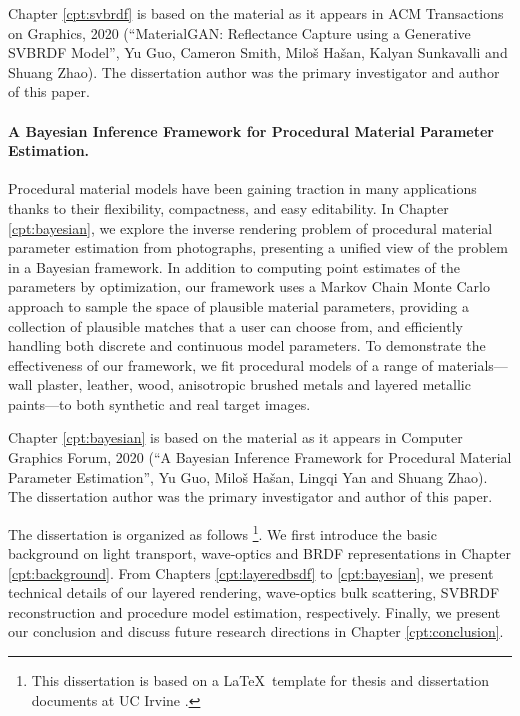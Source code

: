 Chapter \ref{cpt:svbrdf} is based on the material as it appears in ACM Transactions on Graphics, 2020
(“MaterialGAN: Reflectance Capture using a Generative SVBRDF Model”, Yu Guo, Cameron Smith, Milo\v{s} Ha\v{s}an, Kalyan Sunkavalli and Shuang Zhao). The dissertation author was the primary investigator and author of this paper.

\paragraph{A Bayesian Inference Framework for Procedural Material Parameter Estimation.}
Procedural material models have been gaining traction in many applications thanks to their flexibility, compactness, and easy editability.
In Chapter \ref{cpt:bayesian}, we explore the inverse rendering problem of procedural material parameter estimation from photographs, presenting a unified view of the problem in a Bayesian framework. In addition to computing point estimates of the parameters by optimization, our framework uses a Markov Chain Monte Carlo approach to sample the space of plausible material parameters, providing a collection of plausible matches that a user can choose from, and efficiently handling both discrete and continuous model parameters. To demonstrate the effectiveness of our framework, we fit procedural models of a range of materials---wall plaster, leather, wood, anisotropic brushed metals and layered metallic paints---to both synthetic and real target images.

Chapter \ref{cpt:bayesian} is based on the material as it appears in Computer Graphics Forum, 2020
(“A Bayesian Inference Framework for Procedural Material Parameter Estimation”, Yu Guo, Milo\v{s} Ha\v{s}an, Lingqi Yan and Shuang Zhao). The dissertation author was the primary investigator and author of this paper.

The dissertation is organized as follows \footnote{This dissertation is based on a \LaTeX~template for thesis and dissertation documents at UC Irvine \cite{uci-thesis-latex}.}. We first introduce the basic background on light transport, wave-optics and BRDF representations in Chapter \ref{cpt:background}. From Chapters \ref{cpt:layeredbsdf} to \ref{cpt:bayesian}, we present technical details of our layered rendering, wave-optics bulk scattering, SVBRDF reconstruction and procedure model estimation, respectively. Finally, we present our conclusion and discuss future research directions in Chapter \ref{cpt:conclusion}.



